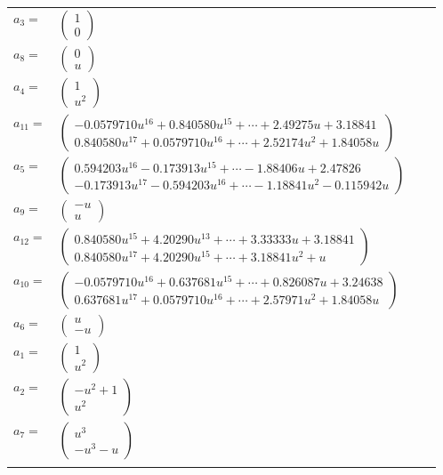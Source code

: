 \documentclass[1p]{elsarticle_modified}
\theoremstyle{definition}
\begin{document}
\begin{tabular}{m{7pt} m{180pt} m{7pt} m{180pt} }
\flushright $a_{3}=$&$\begin{pmatrix}1\\0\end{pmatrix}$ \\
\flushright $a_{8}=$&$\begin{pmatrix}0\\u\end{pmatrix}$ \\
\flushright $a_{4}=$&$\begin{pmatrix}1\\u^2\end{pmatrix}$ \\
\flushright $a_{11}=$&$\begin{pmatrix}-0.0579710 u^{16}+0.840580 u^{15}+\cdots+2.49275 u+3.18841\\0.840580 u^{17}+0.0579710 u^{16}+\cdots+2.52174 u^{2}+1.84058 u\end{pmatrix}$ \\
\flushright $a_{5}=$&$\begin{pmatrix}0.594203 u^{16}-0.173913 u^{15}+\cdots-1.88406 u+2.47826\\-0.173913 u^{17}-0.594203 u^{16}+\cdots-1.18841 u^{2}-0.115942 u\end{pmatrix}$ \\
\flushright $a_{9}=$&$\begin{pmatrix}- u\\u\end{pmatrix}$ \\
\flushright $a_{12}=$&$\begin{pmatrix}0.840580 u^{15}+4.20290 u^{13}+\cdots+3.33333 u+3.18841\\0.840580 u^{17}+4.20290 u^{15}+\cdots+3.18841 u^{2}+u\end{pmatrix}$ \\
\flushright $a_{10}=$&$\begin{pmatrix}-0.0579710 u^{16}+0.637681 u^{15}+\cdots+0.826087 u+3.24638\\0.637681 u^{17}+0.0579710 u^{16}+\cdots+2.57971 u^{2}+1.84058 u\end{pmatrix}$ \\
\flushright $a_{6}=$&$\begin{pmatrix}u\\- u\end{pmatrix}$ \\
\flushright $a_{1}=$&$\begin{pmatrix}1\\u^2\end{pmatrix}$ \\
\flushright $a_{2}=$&$\begin{pmatrix}- u^2+1\\u^2\end{pmatrix}$ \\
\flushright $a_{7}=$&$\begin{pmatrix}u^3\\- u^3- u\end{pmatrix}$\\&\end{tabular}
\end{document}
